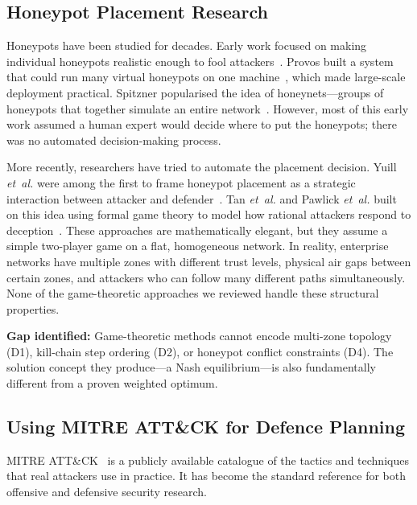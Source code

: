 \documentclass[journal]{IEEEtran}
\newcommand{\etal}{\emph{et~al.}}
\begin{document}
\subsection{Honeypot Placement Research}

Honeypots have been studied for decades.
Early work focused on making individual honeypots realistic
enough to fool attackers~\cite{spitzner2003}.
Provos built a system that could run many virtual honeypots
on one machine~\cite{provos2004}, which made large-scale
deployment practical.
Spitzner popularised the idea of
honeynets---groups of honeypots that together simulate an
entire network~\cite{spitzner2003}.
However, most of this early work assumed a human expert
would decide where to put the honeypots; there was no
automated decision-making process.

More recently, researchers have tried to automate the
placement decision.
Yuill \etal{} were among the first to frame honeypot
placement as a strategic interaction between attacker and
defender~\cite{yuill2004}.
Tan \etal{} and Pawlick \etal{} built on this idea using
formal game theory to model how rational attackers respond to
deception~\cite{tan2011,pawlick2019}.
These approaches are mathematically elegant, but they assume
a simple two-player game on a flat, homogeneous network.
In reality, enterprise networks have multiple zones with
different trust levels, physical air gaps between certain
zones, and attackers who can follow many different paths
simultaneously.
None of the game-theoretic approaches we reviewed handle
these structural properties.

\textbf{Gap identified:} Game-theoretic methods cannot encode
multi-zone topology (D1), kill-chain step ordering (D2), or
honeypot conflict constraints (D4).
The solution concept they produce---a Nash equilibrium---is
also fundamentally different from a proven weighted optimum.

\subsection{Using MITRE ATT\&CK for Defence Planning}

MITRE ATT\&CK~\cite{mitre2023} is a publicly available
catalogue of the tactics and techniques that real attackers
use in practice.
It has become the standard reference for both offensive and
defensive security research.
\end{document}

